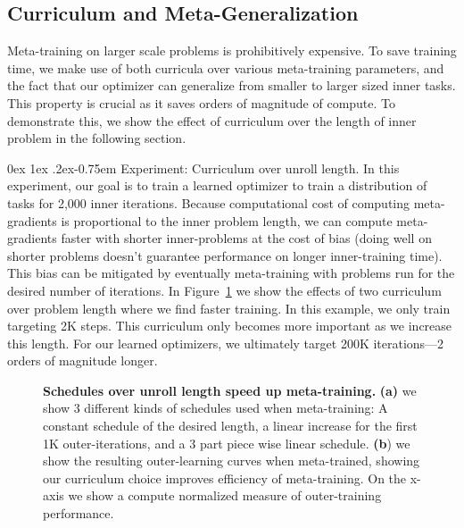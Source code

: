 \documentclass[11pt]{article}
\makeatletter
\renewcommand{\paragraph}{%
  \@startsection{paragraph}{4}%
  {\z@}{0ex \@plus 1ex \@minus .2ex}{-0.75em}%
  {\normalfont\normalsize\bfseries}%
}
\makeatother
\begin{document}
\subsection{Curriculum and Meta-Generalization}
Meta-training on larger scale problems is prohibitively expensive.
To save training time, we make use of both curricula over various meta-training parameters, and the fact that our optimizer can generalize from smaller to larger sized inner tasks.
This property is crucial as it saves orders of magnitude of compute.
To demonstrate this, we show the effect of curriculum over the length of inner problem in the following section.

\paragraph{Experiment: Curriculum over unroll length.} In this experiment, our goal is to train a learned optimizer to train a distribution of tasks for 2,000 inner iterations.
Because computational cost of computing meta-gradients is proportional to the inner problem length, we can compute meta-gradients faster with shorter inner-problems at the cost of bias (doing well on shorter problems doesn't guarantee performance on longer inner-training time).
This bias can be mitigated by eventually meta-training with problems run for the desired number of iterations. In Figure~\ref{fig:sched_unroll_length} we show the effects of two curriculum over problem length where we find faster training. In this example, we only train targeting 2K steps. This curriculum only becomes more important as we increase this length. For our learned optimizers, we ultimately target 200K iterations---2 orders of magnitude longer.

\begin{figure}
    \centering
    \vspace{-1em}
    \caption{\textbf{Schedules over unroll length speed up meta-training.} \textbf{(a)} we show 3 different kinds of schedules used when meta-training: A constant schedule of the desired length, a linear increase for the first 1K outer-iterations, and a 3 part piece wise linear schedule. \textbf{(b}) we show the resulting outer-learning curves when meta-trained, showing our curriculum choice improves efficiency of meta-training. On the x-axis we show a compute normalized measure of outer-training performance. 
    \label{fig:sched_unroll_length}
    }
\end{figure}
\end{document}
